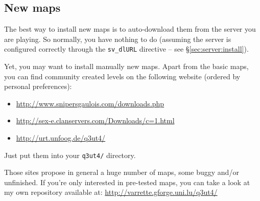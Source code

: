 \subsection{New maps}

The best way to install new maps is to auto-download them from the server you
are playing. So normally, you have nothing to do (assuming the server is
configured correctly through the \texttt{sv\_dlURL} directive -- see
\S\ref{sec:server:install}).

Yet, you may want to install manually new maps. 
Apart from the basic maps, you can find community created levels on the
following website (ordered by personal preferences):
\begin{itemize}\setitemsep
\item \url{http://www.snipersgaulois.com/downloads.php}
\item \url{http://sex-e.clanservers.com/Downloads/c=1.html}
\item \url{http://urt.unfoog.de/q3ut4/}
\end{itemize}

Just put them into your \texttt{q3ut4/} directory.

Those sites propose in general a huge number of maps, some buggy and/or
unfinished. If you're only interested in pre-tested maps, you can take a look at
my own repository available at: \url{http://varrette.gforge.uni.lu/q3ut4/}




%

